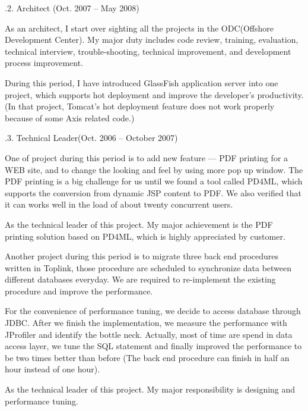 
\smallskip\noindent
{}.2. Architect (Oct. 2007 -- May 2008)\par
\noindent
As an architect, I start over sighting all the projects in the ODC(Offshore Development Center).
My major duty includes code review, training, evaluation, technical interview, trouble-shooting,
 technical improvement, and development process improvement. 

During this period, I have introduced GlassFish application server into one project, which 
supports hot deployment and improve the developer's productivity. (In that project, Tomcat's
hot deployment feature does not work properly because of some Axis related code.)


.3. Technical Leader(Oct. 2006 -- October 2007)\par
\noindent
One of project during this period is to add new feature --- PDF printing for a WEB site, and to
change the looking and feel by using more pop up window. The PDF printing 
is a big challenge for us until we found a tool called PD4ML, which supports
the conversion from dynamic JSP content to PDF. We also verified that it can 
works well in the load of about twenty concurrent users. 

As the technical leader of this project. My major achievement is
the PDF printing solution based on PD4ML, which is highly appreciated by customer.

\smallskip

Another project during this period is to migrate three back end procedures
written in Toplink, those procedure are scheduled to synchronize data between 
different databases everyday. We are required to re-implement
the existing procedure and improve the performance. 

For the convenience of performance tuning, we decide to access database through JDBC.
After we finish the implementation, we measure the performance with JProfiler and identify the
bottle neck. Actually, most of time are spend in data access layer, we tune
the SQL statement and finally improved the performance to be two times better than before
(The back end procedure can finish in half an hour instead of one hour).

As the technical leader of this project. My major responsibility is
designing and performance tuning.

